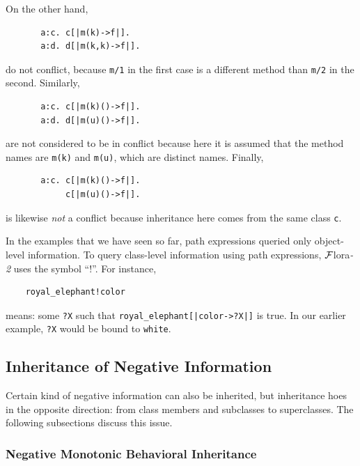 \documentclass[11pt]{article}
\newcommand{\FLORA}{{\mbox{\sc ${\cal F}${lora}\rm\emph{-2}}}\xspace}
\newcommand{\FLSYSTEM}{\FLORA}
\begin{document}
\begin{enumerate}
  On the other hand,
\begin{verbatim}
       a:c. c[|m(k)->f|].    
       a:d. d[|m(k,k)->f|].     
\end{verbatim}
  do not conflict, because {\tt m/1} in the first case is a different
  method than {\tt m/2} in the second. Similarly,
\begin{verbatim}
       a:c. c[|m(k)()->f|].    
       a:d. d[|m(u)()->f|].     
\end{verbatim}
  are not considered to be in conflict because here it is assumed that the
  method names are {\tt m(k)} and {\tt m(u)}, which are distinct names.
  Finally,
\begin{verbatim}
       a:c. c[|m(k)()->f|].    
            c[|m(u)()->f|].     
\end{verbatim}
  is likewise \emph{not} a conflict because inheritance here comes from the same
  class \texttt{c}.
\end{enumerate}

In the examples that we have seen so far, path expressions queried only
object-level information. To query class-level information using path
expressions, \FLSYSTEM uses the symbol ``!''. For instance,
\begin{verbatim}
    royal_elephant!color
\end{verbatim}
means: some \texttt{?X}  such that \texttt{royal\_elephant[|color->?X|]} is
true.  In our earlier example, \texttt{?X} would be bound to
\texttt{white}.  

\subsection{Inheritance of Negative Information}

Certain kind of negative information can also be inherited, but inheritance
hoes in the opposite direction: from class members and subclasses to
superclasses. The following
subsections discuss this issue.

\subsubsection{Negative Monotonic Behavioral Inheritance}
\end{document}
